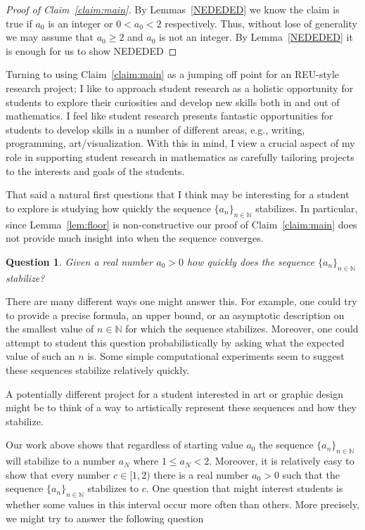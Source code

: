 \documentclass[10pt,reqno]{amsart}
\newtheorem{question}[lemma]{Question}
\theoremstyle{remark}
\newcommand{\N}{\mathbb{N}}
\begin{document}
\begin{proof}[Proof of Claim~\ref{claim:main}]
By Lemmas~\ref{NEDEDED} we know the claim is true if $a_{0}$ is an integer or $0<a_{0}<2$ respectively. Thus, without lose of generality we may assume that $a_{0}\geq 2$ and $a_{0}$ is not an integer. By Lemma~\ref{NEDEDED}  it is enough for us to show NEDEDED
\end{proof}

Turning to using Claim~\ref{claim:main} as a jumping off point for an REU-style research project; I like to approach student research as a holistic opportunity for students to explore their curiosities and develop new skills both in and out of mathematics. I feel like student research presents fantastic opportunities for students to develop skills in a number of different areas, e.g., writing, programming, art/visualization. With this in mind, I view a crucial aspect of my role in supporting student research in mathematics as carefully tailoring projects to the interests and goals of the students.

That said a natural first questions that I think may be interesting for a student to explore is studying how quickly the sequence $\{a_{n}\}_{n\in\N}$ stabilizes. In particular, since Lemma~\ref{lem:floor} is non-constructive our proof of Claim~\ref{claim:main} does not provide much insight into when the sequence converges. 

\begin{question}
Given a real number $a_{0}>0$ how quickly does the sequence $\{a_{n}\}_{n\in\N}$ stabilize?
\end{question}

There are many different ways one might answer this. For example, one could try to provide a precise formula, an upper bound,  or an asymptotic description on the smallest value of $n\in \N$ for which the sequence stabilizes. Moreover, one could attempt to student this question probabilistically by asking what the expected value of such an $n$ is. Some simple computational experiments seem to suggest these sequences stabilize relatively quickly. 


A potentially different project for a student interested in art or graphic design might be to think of a way to artistically represent these sequences and how they stabilize. 

Our work above shows that regardless of starting value $a_{0}$ the sequence $\{a_{n}\}_{n\in\N}$ will stabilize to a number $a_{N}$ where $1\leq a_{N} < 2$. Moreover, it is relatively easy to show that every number $c\in[1,2)$ there is a real number $a_{0}>0$ such that the sequence $\{a_{n}\}_{n\in\N}$ stabilizes to $c$. One question that might interest students is whether some values in this interval occur more often than others. More precisely, we might try to answer the following question
\end{document}
